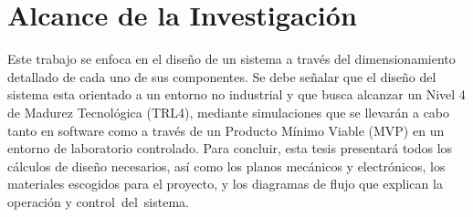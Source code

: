 \section{Alcance de la Investigación}

Este trabajo se enfoca en el diseño de un sistema a través del dimensionamiento detallado de cada uno de sus componentes. Se debe señalar que el diseño del sistema esta orientado a un entorno no industrial y que busca alcanzar un Nivel 4 de Madurez Tecnológica (TRL4), mediante simulaciones que se llevarán a cabo tanto en software como a través de un Producto Mínimo Viable (MVP) en un entorno de laboratorio controlado. Para concluir, esta tesis presentará todos los cálculos de diseño necesarios, así como los planos mecánicos y electrónicos, los materiales escogidos para el proyecto, y los diagramas de flujo que explican la operación y control del sistema.
